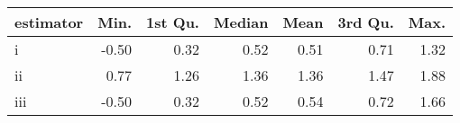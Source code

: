 \begin{tabular}{lrrrrrr}
  \hline
estimator & Min. & 1st Qu. & Median & Mean & 3rd Qu. & Max. \\ 
  \hline
i & -0.50 & 0.32 & 0.52 & 0.51 & 0.71 & 1.32 \\ 
  ii & 0.77 & 1.26 & 1.36 & 1.36 & 1.47 & 1.88 \\ 
  iii & -0.50 & 0.32 & 0.52 & 0.54 & 0.72 & 1.66 \\ 
   \hline
\end{tabular}

